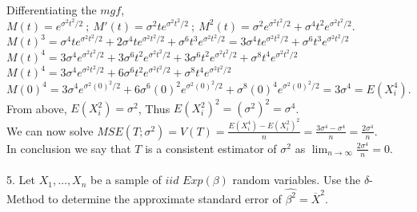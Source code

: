 \documentclass[12pt]{article}
\newcommand{\XB}{\color{black}}
\newcommand{\XBB}{\color{blue}}
\begin{document}
\noindent
Differentiating the $ mgf $, $ \displaystyle M(t) = e^{\sigma^{2}t^{2}/2} \ ; \ M'(t) = \sigma^{2}te^{\sigma^{2}t^{2}/2} \ ; \ M^{2}(t) = \sigma^{2}e^{\sigma^{2}t^{2}/2} + \sigma^{4}t^{2}e^{\sigma^{2}t^{2}/2} $.\\

$ \displaystyle M(t)^{3} = \sigma^{4}te^{\sigma^{2}t^{2}/2} + 2\sigma^{4}te^{\sigma^{2}t^{2}/2} + \sigma^{6}t^{3}e^{\sigma^{2}t^{2}/2} = 3\sigma^{4}te^{\sigma^{2}t^{2}/2} + \sigma^{6}t^{3}e^{\sigma^{2}t^{2}/2} $ \\

$ \displaystyle M(t)^{4} = 3\sigma^{4}e^{\sigma^{2}t^{2}/2} + 3\sigma^{6}t^{2}e^{\sigma^{2}t^{2}/2} + 3\sigma^{6}t^{2}e^{\sigma^{2}t^{2}/2} + \sigma^{8}t^{4}e^{\sigma^{2}t^{2}/2} $ \\

$ \displaystyle M(t)^{4} = 3\sigma^{4}e^{\sigma^{2}t^{2}/2} + 6\sigma^{6}t^{2}e^{\sigma^{2}t^{2}/2} + \sigma^{8}t^{4}e^{\sigma^{2}t^{2}/2} $ \\

$ \displaystyle M(0)^{4} = 3\sigma^{4}e^{\sigma^{2}(0)^{2}/2} + 6\sigma^{6}(0)^{2}e^{\sigma^{2}(0)^{2}/2} + \sigma^{8}(0)^{4}e^{\sigma^{2}(0)^{2}/2} = 3\sigma^{4} = E(X_{i}^{4}). $ \\

\noindent
From above, $ E(X_{i}^{2}) = \sigma^{2} $, Thus $ E(X_{i}^{2})^{2} = (\sigma^{2})^{2} = \sigma^{4} $. \\

\noindent
We can now solve $ \displaystyle MSE(T; \sigma^{2}) = V(T) = \frac{E(X_{i}^{4}) - E(X_{i}^{2})^{2}}{n} = \frac{3\sigma^{4} - \sigma^{4}}{n} = \frac{2\sigma^{4}}{n} $. \\

\noindent
In conclusion we say that $ T $ is a consistent estimator of $ \sigma^{2} $ as $ \displaystyle \lim_{n \to \infty} \frac{2\sigma^{4}}{n} = 0 $. \\

\newpage
\XBB\hrulefill\XB \\

5. Let $ X_{1}, \dots, X_{n} $ be a sample of $ iid $ $ Exp(\beta) $ random variables. Use the $ \delta $-Method to determine the approximate standard error of $ \hat{\beta^{2}} = \overline{X}^{2} $. \\

\XBB\hrulefill\XB
\vspace{5mm} \\
\end{document}
